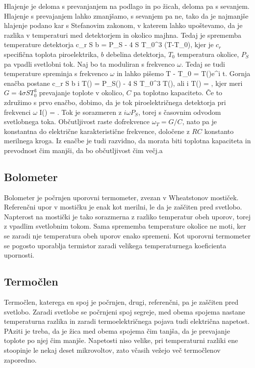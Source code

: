 Hlajenje je deloma s prevanjanjem na podlago in po žicah, deloma pa s
sevanjem. Hlajenje s prevajanjem lahko zmanjšamo, s sevanjem pa ne, tako da je najmanjše
hlajenje podano kar s Stefanovim zakonom, v katerem lahko upoštevamo, da je razlika
v temperaturi med detektorjem in okolico majhna. Tedaj je sprememba temperature detektorja
\beq
c_r \varrho S b  = P_S - 4 \sigma S T_0^3 (T-T_0),
\eeq
kjer je $c_r$ specifična toplota piroelektrika, $b$ debelina detektorja, $T_0$ temperatura
okolice, $P_S$ pa vpadli svetlobni tok. Naj bo ta moduliran s frekvenco $\omega$. Tedaj se tudi
temperature spreminja s frekvenco $\omega$ in lahko pišemo
\beq
T - T_0 = T(\omega)e^{i \omega t}.
\eeq
Gornja enačba postane
\beq
c_r \varrho S b i \omega T(\omega) = P_S(\omega) - 4 \sigma S T_0^3 T(\omega),
\eeq
ali
\beq
i \omega T(\omega) = ,
\eeq
kjer meri $G = 4 \sigma S T_0^3$ prevajanje toplote v okolico, $C$ pa toplotno
kapaciteto. Če to združimo s prvo enačbo, dobimo, da je tok piroelektričnega detektorja
pri frekvenci $\omega$ 
\beq
I(\omega) = .
\eeq
Tok je sorazmeren z $i\omega P_S$, torej s časovnim odvodom svetlobnega toka. Občutljivost
raste dofrekvence $\omega_T = G/C$, nato pa je konstantna do električne karakteristične frekvence,
določene z $RC$ konstanto merilnega kroga. Iz enačbe je tudi razvidno, da morata biti toplotna
kapaciteta in prevodnost čim manjši, da bo občutljivost čim večj.a




\subsection*{Bolometer}


Bolometer je počrnjen uporovni termometer, zvezan v Wheatstonov mostiček. Referenčni upor v
mostičku je enak kot merilni, le da je zaščiten pred svetlobo. Napterost na mostički je tako 
sorazmerna z razliko temperatur obeh uporov, torej z vpadlim svetlobnim tokom. Sama
sprememba temperature okolice ne moti, ker se zaradi nje temperatura obeh uporov enako spremeni. 
Kot uporovni termometer se pogosto uporablja termistor zaradi velikega temperaturnega koeficienta
upornosti.




\subsection*{Termočlen}

Termočlen, katerega en spoj je počrnjen, drugi, referenčni, pa je zaščiten pred svetlobo.
Zaradi svetlobe se počrnjeni spoj segreje, med obema spojema nastane temperaturna razlika in 
zaradi termoelektričnega pojava tudi električna napetost. PAziti je treba, da je žica med 
obema spojema čim tanjša, da je prevajanje toplote po njej čim manjše. Napetosti niso velike,
pri temperaturni razliki ene stoopinje le nekaj deset mikrovoltov, zato včasih vežejo 
več termočlenov zaporedno.

